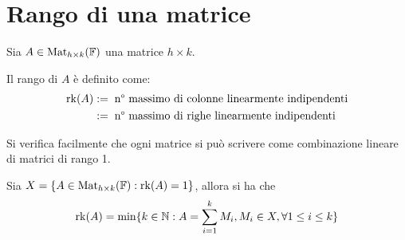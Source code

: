 \documentclass[../main.tex]{subfiles}
\begin{document}
\section{Rango di una matrice}
\begin{definition}
    Sia $A \in \operatorname{Mat}_{h \times k}(\mathbb{F})$ una matrice $h \times k$.

    Il rango di $A$ è definito come:
    \begin{align*}
        \operatorname{rk}(A) & := \; \text{n° massimo di colonne linearmente indipendenti} \\
               & := \; \text{n° massimo di righe linearmente indipendenti}
    \end{align*}
\end{definition}
Si verifica facilmente che ogni matrice si può scrivere come combinazione lineare di matrici di rango 1.

Sia $X = \{A \in \operatorname{Mat}_{h \times k}(\mathbb{F}) : \operatorname{rk}(A) = 1\}$, allora si ha che
\begin{equation*}
    \operatorname{rk}(A) = \min\{k \in \mathbb{N} : A = \sum_{i = 1}^{k} M_i , M_i \in X, \forall 1 \leq i \leq k\}
\end{equation*}
\end{document}
